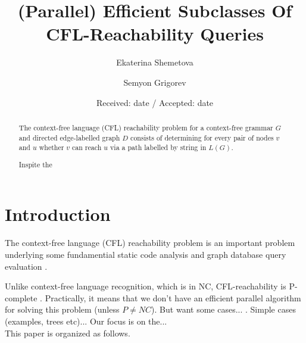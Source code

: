 \documentclass[smallextended]{svjour3}       %
\begin{document}
\title{(Parallel) Efficient Subclasses Of CFL-Reachability Queries%
}


\author{Ekaterina Shemetova         \and
        Semyon Grigorev %
}



\date{Received: date / Accepted: date}


\maketitle

\begin{abstract}
The context-free language (CFL) reachability problem for a context-free grammar $G$ and directed edge-labelled graph $D$ consists of determining for every pair of nodes  $v$ and $u$ whether $v$ can reach $u$ via a path labelled by string in $L(G)$. 
\par
Inspite the 
\end{abstract}



\section{Introduction}
\label{intro}
The context-free language (CFL) reachability problem is an important problem underlying some fundamential static code analysis \cite*{RepsBasic, Incremental} and graph database query evaluation \cite{HellingsCFPQ}\cite{RDF}\cite{GrigorevRagozina}.
\par
Unlike context-free language recognition, which is in NC, CFL-reachability is P-complete \cite{Yannakakis}\cite{RepSeq}. Practically, it means that we don't have an efficient parallel algorithm for solving this problem (unless $P \neq NC$). But want some cases... . Simple cases (examples, trees etc)... Our focus is on the...
\\This paper is organized as follows.
\end{document}
